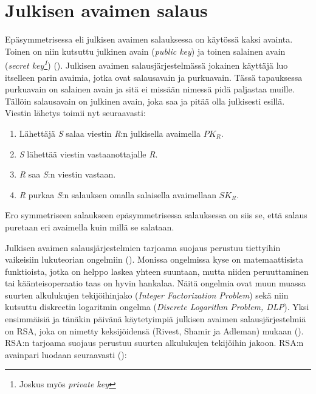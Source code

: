 \section{Julkisen avaimen salaus}
 Epäsymmetrisessa eli julkisen avaimen salauksessa on käytössä kaksi avainta. Toinen on niin kutsuttu julkinen avain (\emph{public key}) ja toinen salainen avain (\emph{secret key\footnote{Joskus myös \emph{private key}}}) (\cite{bellare2005introduction}). Julkisen avaimen salausjärjestelmässä jokainen käyttäjä luo itselleen parin avaimia, jotka ovat salausavain ja purkuavain. Tässä tapauksessa purkuavain on salainen avain ja sitä ei missään nimessä pidä paljastaa muille. Tällöin salausavain on julkinen avain, joka saa ja pitää olla julkisesti esillä. Viestin lähetys toimii nyt seuraavasti:
 
 \begin{enumerate}
     \item Lähettäjä \emph{S} salaa viestin \emph{R}:n julkisella avaimella $PK_{R}$.
     \item \emph{S} lähettää viestin vastaanottajalle \emph{R}.
     \item \emph{R} saa \emph{S}:n viestin vastaan.
     \item \emph{R} purkaa \emph{S}:n salauksen omalla salaisella avaimellaan $SK_{R}$.
 \end{enumerate}
Ero symmetriseen salaukseen epäsymmetrisessa salauksessa on siis se, että salaus puretaan eri avaimella kuin millä se salataan.
 
  Julkisen avaimen salausjärjestelmien tarjoama suojaus perustuu tiettyihin vaikeisiin lukuteorian ongelmiin (\cite{mavroeidis2018impact}). Monissa ongelmissa kyse on matemaattisista funktioista, jotka on helppo laskea yhteen suuntaan, mutta niiden peruuttaminen tai käänteisoperaatio taas on hyvin hankalaa. Näitä ongelmia ovat muun muassa suurten alkulukujen tekijöihinjako (\emph{Integer Factorization Problem}) sekä niin kutsuttu diskreetin logaritmin ongelma (\emph{Discrete Logarithm Problem, DLP}).
  Yksi ensimmäisiä ja tänäkin päivänä käytetyimpiä julkisen avaimen salausjärjestelmiä on RSA, joka on nimetty keksijöidensä (Rivest, Shamir ja Adleman) mukaan (\cite{montgomery1994survey}). RSA:n tarjoama suojaus perustuu suurten alkulukujen tekijöihin jakoon. RSA:n avainpari luodaan seuraavasti  (\cite{10.1145/359340.359342}):
  
